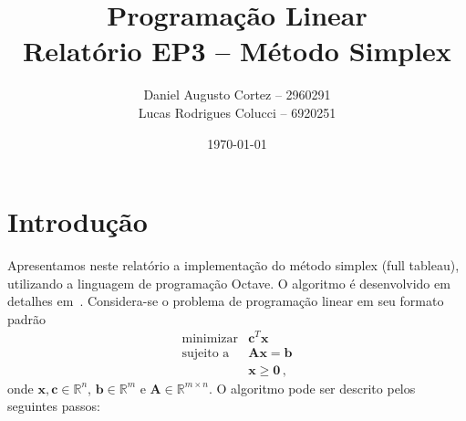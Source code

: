 \documentclass[12pt,a4paper]{article}
\newcommand{\vet}{\mathbf}                                   %
\newcommand{\zerar}{\setcounter{equation}{0}\setcounter{figure}{0}\setcounter{table}{0}}
\newcommand{\R}{\mathbb{R}}
\begin{document}
\title{Programação Linear \\ Relatório EP3 -- Método Simplex}
\author{Daniel Augusto Cortez -- 2960291 \\ Lucas Rodrigues Colucci -- 6920251}
\date{\today}

\maketitle


\zerar
\section{Introdução}
\label{sec:introducao}

Apresentamos neste relatório a implementação do método simplex (full tableau), utilizando a 
linguagem de programação Octave. O algoritmo é desenvolvido em detalhes em~\cite{bertsimas}.
Considera-se o problema de programação linear em seu formato padrão
%
\begin{equation} \label{eq:PL}
	\begin{array}{rl}
		\text{minimizar} & \vet{c}^T \vet{x} \\
		\text{sujeito a} & \vet{A} \vet{x} = \vet{b} \\\
		                 & \vet{x} \geq \vet{0} \, ,
	 \end{array}
\end{equation}
%
onde $\vet{x}, \vet{c} \in \R^n$, $\vet{b} \in \R^m$ e $\vet{A} \in \R^{m \times n}$. 
O algoritmo pode ser descrito pelos seguintes passos:

\vspace{0.5cm}
\end{document}
